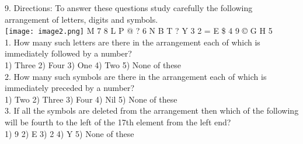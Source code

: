 \documentclass[
]{article}
\begin{document}
9. Directions: To answer these questions study carefully the following arrangement of letters, digits and symbols.\\
\texttt{[image: image2.png]}
M 7 \sum \hspace{1mm}8 \hspace{1mm}L \hspace{1mm}P \hspace{1mm}@ \hspace{1mm}? \hspace{1mm}6 \hspace{1mm}N \hspace{1mm}B \hspace{1mm}T \hspace{1mm}? \hspace{1mm}Y \hspace{1mm}3 \hspace{1mm}2 \hspace{1mm}= \hspace{1mm}E \hspace{1mm}\$ \hspace{1mm}4\hspace{1mm} 9\hspace{1mm} ©\hspace{1mm} G\hspace{1mm} H\hspace{1mm} 5\\

1. How many such letters are there in the arrangement each of which is immediately followed by a number?\\
1) Three \hspace{2mm}2) Four \hspace{2mm}3) One \hspace{2mm}4) Two \hspace{2mm}5) None of these\\

2. How many such symbols are there in the arrangement each of which is immediately preceded by a number?\\
1) Two \hspace{2mm}2) Three \hspace{2mm}3) Four \hspace{2mm}4) Nil \hspace{2mm}5) None of these\\

3. If all the symbols are deleted from the arrangement then which of the following will be fourth to the left of the 17th element from the left end?\\
1) 9 \hspace{2mm}2) E \hspace{2mm}3) 2 \hspace{2mm}4) Y \hspace{2mm}5) None of these\\
\end{document}
